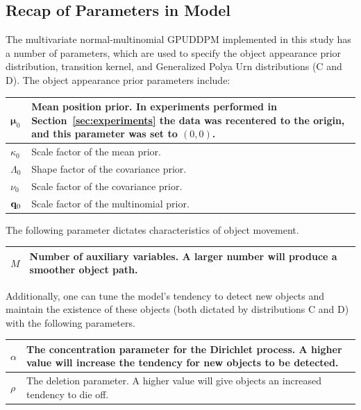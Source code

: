 \documentclass{article}
\begin{document}
\subsection{Recap of Parameters in Model}
\label{sec:recapofparameters}

The multivariate normal-multinomial GPUDDPM implemented in this study has a number of parameters, which are used to specify the object appearance prior distribution, transition kernel, and Generalized Polya Urn distributions (C and D). %
The object appearance prior parameters include:
\begin{center}
\begin{tabular}[c]{| l |  p{7cm} | }
\hline
$\boldsymbol{\mu}_{0}$  &  Mean position prior. In experiments performed in Section~\ref{sec:experiments} the data was recentered to the origin, and this parameter was set to $(0,0)$. \\ \hline
$\kappa_{0}$  &  Scale factor of the mean prior.\\ \hline
$\Lambda_{0}$  &  Shape factor of the covariance prior.\\ \hline
$\nu_{0}$  &  Scale factor of the covariance prior.\\ \hline
$\bold{q}_{0}$  &  Scale factor of the multinomial prior. \\
\hline
\end{tabular}
\end{center} \vspace{3mm}
The following parameter dictates characteristics of object movement.
\begin{center}
\begin{tabular}[c]{ | l | p{7cm} | }
\hline
$M$  &  Number of auxiliary variables. A larger number will produce a smoother object path.\\
\hline
\end{tabular}
\end{center} \vspace{3mm}
Additionally, one can tune the model's tendency to detect new objects and maintain the existence of these objects (both dictated by distributions C and D) with the following parameters.
\begin{center}
\begin{tabular}[c]{ | l | p{7cm} | }
\hline
$\alpha$  &  The concentration parameter for the Dirichlet process. A higher value will increase the tendency for new objects to be detected.\\ \hline
$\rho$  &  The deletion parameter. A higher value will give objects an increased tendency to die off. \\
\hline
\end{tabular}
\end{center}
\end{document}
